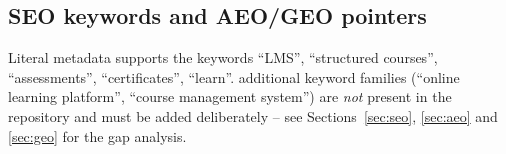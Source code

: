 \subsection{SEO keywords and AEO/GEO pointers}

Literal metadata supports the keywords ``LMS'', ``structured courses'', ``assessments'', ``certificates'', ``learn''.  additional keyword families (``online learning platform'', ``course management system'') are \emph{not} present in the repository and must be added deliberately -- see Sections~\ref{sec:seo}, \ref{sec:aeo} and \ref{sec:geo} for the gap analysis.
